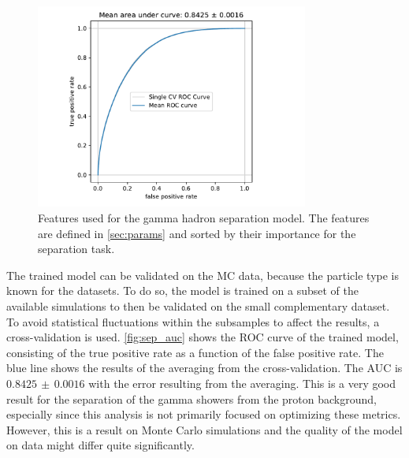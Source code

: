 \begin{figure}
  \centering
  \includegraphics[width=0.8\textwidth, page=4]{Plots/results/DBSCAN/separation_performance.pdf}
  \caption{Features used for the gamma hadron separation model. The features are defined in \autoref{sec:params} and sorted by their importance for the separation task.}
  \label{fig:sep_feat}
\end{figure}
%
The trained model can be validated on the MC data, because the particle type is
known for the datasets. To do so, the model is trained on a subset of the
available simulations to then be validated on the small complementary
dataset. To avoid statistical fluctuations within the subsamples to affect the
results, a cross-validation is used. \autoref{fig:sep_auc} shows the ROC curve
of the trained model, consisting of the true positive rate as a function of the
false positive rate. The blue line shows the results of the averaging from the
cross-validation. The AUC is $0.8425\,\pm\,0.0016$ with the error resulting
from the averaging. This is a very good result for the separation of the gamma
showers from the proton background, especially since this analysis is not
primarily focused on optimizing these metrics. However, this is a result on
Monte Carlo simulations and the quality of the model on data might differ quite
significantly.
%

